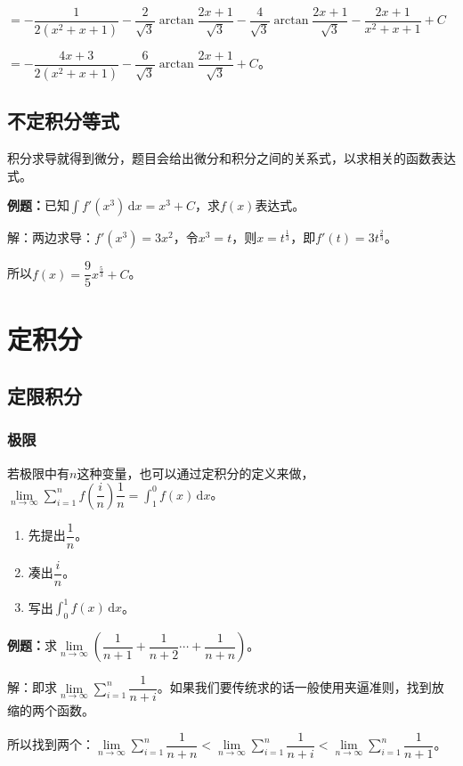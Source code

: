 \documentclass[UTF8, 12pt]{ctexart}
\begin{document}
$=-\dfrac{1}{2(x^2+x+1)}-\dfrac{2}{\sqrt{3}}\arctan\dfrac{2x+1}{\sqrt{3}}-\dfrac{4}{\sqrt{3}}\arctan\dfrac{2x+1}{\sqrt{3}}-\dfrac{2x+1}{x^2+x+1}+C$

$=-\dfrac{4x+3}{2(x^2+x+1)}-\dfrac{6}{\sqrt{3}}\arctan\dfrac{2x+1}{\sqrt{3}}+C$。

\subsection{不定积分等式}

积分求导就得到微分，题目会给出微分和积分之间的关系式，以求相关的函数表达式。

\textbf{例题：}已知$\int f'(x^3)\,\textrm{d}x=x^3+C$，求$f(x)$表达式。

解：两边求导：$f'(x^3)=3x^2$，令$x^3=t$，则$x=t^\frac{1}{3}$，即$f'(t)=3t^\frac{2}{3}$。

所以$f(x)=\dfrac{9}{5}x^\frac{5}{3}+C$。

\section{定积分}

\subsection{定限积分}

\subsubsection{极限}

若极限中有$n$这种变量，也可以通过定积分的定义来做，$\lim\limits_{n\to\infty}\sum\limits_{i=1}^nf\left(\dfrac{i}{n}\right)\dfrac{1}{n}=\int_1^0f(x)\,\textrm{d}x$。

\begin{enumerate}
    \item 先提出$\dfrac{1}{n}$。
    \item 凑出$\dfrac{i}{n}$。
    \item 写出$\int_0^1f(x)\,\textrm{d}x$。
\end{enumerate}

\textbf{例题：}求$\lim\limits_{n\to\infty}\left(\dfrac{1}{n+1}+\dfrac{1}{n+2}\cdots+\dfrac{1}{n+n}\right)$。

解：即求$\lim\limits_{n\to\infty}\sum\limits_{i=1}^n\dfrac{1}{n+i}$。如果我们要传统求的话一般使用夹逼准则，找到放缩的两个函数。

所以找到两个：$\lim\limits_{n\to\infty}\sum\limits_{i=1}^n\dfrac{1}{n+n}<\lim\limits_{n\to\infty}\sum\limits_{i=1}^n\dfrac{1}{n+i}<\lim\limits_{n\to\infty}\sum\limits_{i=1}^n\dfrac{1}{n+1}$。
\end{document}
